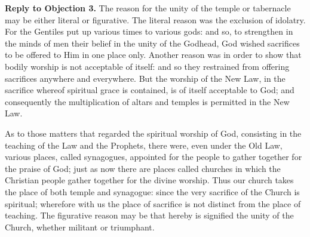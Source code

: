 \textbf{Reply to Objection 3.} The reason for the unity of the temple or tabernacle may be either literal or figurative. The literal reason was the exclusion of idolatry. For the Gentiles put up various times to various gods: and so, to strengthen in the minds of men their belief in the unity of the Godhead, God wished sacrifices to be offered to Him in one place only. Another reason was in order to show that bodily worship is not acceptable of itself: and so they restrained from offering sacrifices anywhere and everywhere. But the worship of the New Law, in the sacrifice whereof spiritual grace is contained, is of itself acceptable to God; and consequently the multiplication of altars and temples is permitted in the New Law.

As to those matters that regarded the spiritual worship of God, consisting in the teaching of the Law and the Prophets, there were, even under the Old Law, various places, called synagogues, appointed for the people to gather together for the praise of God; just as now there are places called churches in which the Christian people gather together for the divine worship. Thus our church takes the place of both temple and synagogue: since the very sacrifice of the Church is spiritual; wherefore with us the place of sacrifice is not distinct from the place of teaching. The figurative reason may be that hereby is signified the unity of the Church, whether militant or triumphant.

